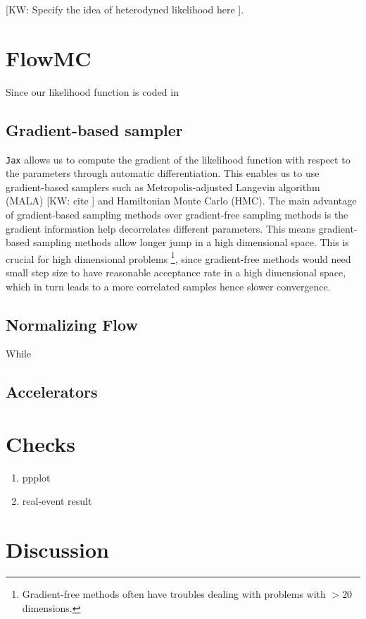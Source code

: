 \documentclass[twocolumn]{aastex631}
\newcommand{\kw}[1]{{\color{rb4}[KW: #1 ]}}
\begin{document}
\kw{Specify the idea of heterodyned likelihood here}.

\section{FlowMC}

Since our likelihood function is coded in 
\subsection{Gradient-based sampler}
\label{sec:gradient}

\texttt{Jax} allows us to compute the gradient of the likelihood function with respect to the parameters through automatic differentiation.
This enables us to use gradient-based samplers such as Metropolis-adjusted Langevin algorithm (MALA) \kw{cite} and Hamiltonian Monte Carlo (HMC)\cite{kw}.
The main advantage of gradient-based sampling methods over gradient-free sampling methods is the gradient information help decorrelates different parameters.
This means gradient-based sampling methods allow longer jump in a high dimensional space.
This is crucial for high dimensional problems \footnote{Gradient-free methods often have troubles dealing with problems with $>20$ dimensions.},
since gradient-free methods would need small step size to have reasonable acceptance rate in a high dimensional space,
which in turn leads to a more correlated samples hence slower convergence.

\subsection{Normalizing Flow}
\label{sec:flow}

While 

\subsection{Accelerators}
\label{sec:accelerators}


\section{Checks}

\begin{enumerate}
    \item ppplot
    \item real-event result
\end{enumerate}

\section{Discussion}
\end{document}
